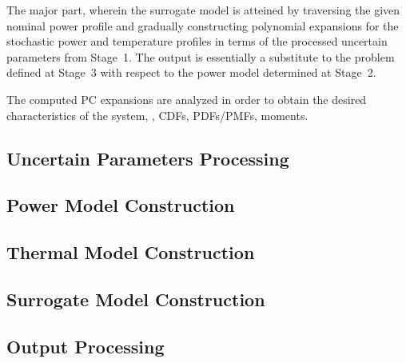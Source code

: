  The major part, wherein the surrogate model is atteined by traversing the given nominal power profile and gradually constructing polynomial expansions for the stochastic power and temperature profiles in terms of the processed uncertain parameters from Stage~1. The output is essentially a substitute to the problem defined at Stage~3 with respect to the power model determined at Stage~2.

 The computed PC expansions are analyzed in order to obtain the desired characteristics of the system, \eg, CDFs, PDFs/PMFs, moments.

\subsection{Uncertain Parameters Processing} 


\subsection{Power Model Construction} 


\subsection{Thermal Model Construction} 


\subsection{Surrogate Model Construction} 


\subsection{Output Processing} 

